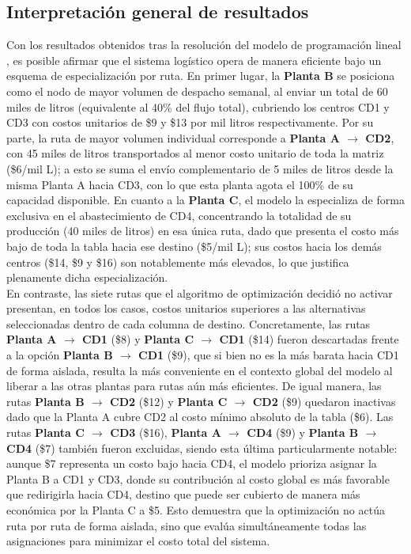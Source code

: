\documentclass[12pt,a4paper]{article}
\begin{document}
\subsection{Interpretaci\'{o}n general de resultados}

\noindent
Con los resultados obtenidos tras la resoluci\'{o}n del modelo de programaci\'{o}n lineal 
, es posible afirmar que el sistema log\'{i}stico opera de manera eficiente 
bajo un esquema de especializaci\'{o}n por ruta. En primer lugar, la \textbf{Planta B} se 
posiciona como el nodo de mayor volumen de despacho semanal, al enviar un total de 60 miles 
de litros (equivalente al 40\% del flujo total), cubriendo los centros CD1 y CD3 con costos 
unitarios de \$9 y \$13 por mil litros respectivamente. Por su parte, la ruta de mayor volumen 
individual corresponde a \textbf{Planta A $\to$ CD2}, con 45 miles de litros transportados al 
menor costo unitario de toda la matriz (\$6/mil L); a esto se suma el env\'{i}o complementario 
de 5 miles de litros desde la misma Planta A hacia CD3, con lo que esta planta agota el 100\% 
de su capacidad disponible. En cuanto a la \textbf{Planta C}, el modelo la especializa de forma 
exclusiva en el abastecimiento de CD4, concentrando la totalidad de su producci\'{o}n (40 miles 
de litros) en esa \'{u}nica ruta, dado que presenta el costo m\'{a}s bajo de toda la tabla hacia 
ese destino (\$5/mil L); sus costos hacia los dem\'{a}s centros (\$14, \$9 y \$16) son 
notablemente m\'{a}s elevados, lo que justifica plenamente dicha especializaci\'{o}n.\\

En contraste, las siete rutas que el algoritmo de optimizaci\'{o}n decidi\'{o} no activar 
presentan, en todos los casos, costos unitarios superiores a las alternativas seleccionadas 
dentro de cada columna de destino. Concretamente, las rutas 
\textbf{Planta A $\to$ CD1} (\$8) y \textbf{Planta C $\to$ CD1} (\$14) fueron descartadas 
frente a la opci\'{o}n \textbf{Planta B $\to$ CD1} (\$9), que si bien no es la m\'{a}s barata 
hacia CD1 de forma aislada, resulta la m\'{a}s conveniente en el contexto global del modelo al 
liberar a las otras plantas para rutas a\'{u}n m\'{a}s eficientes. De igual manera, las rutas 
\textbf{Planta B $\to$ CD2} (\$12) y \textbf{Planta C $\to$ CD2} (\$9) quedaron inactivas dado 
que la Planta A cubre CD2 al costo m\'{i}nimo absoluto de la tabla (\$6). Las rutas 
\textbf{Planta C $\to$ CD3} (\$16), \textbf{Planta A $\to$ CD4} (\$9) y \textbf{Planta B $\to$ CD4} 
(\$7) tambi\'{e}n fueron excluidas, siendo esta \'{u}ltima particularmente notable: aunque \$7 
representa un costo bajo hacia CD4, el modelo prioriza asignar la Planta B a CD1 y CD3, donde 
su contribuci\'{o}n al costo global es m\'{a}s favorable que redirigirla hacia CD4, destino que 
puede ser cubierto de manera m\'{a}s econ\'{o}mica por la Planta C a \$5. Esto demuestra que la 
optimizaci\'{o}n no act\'{u}a ruta por ruta de forma aislada, sino que eval\'{u}a 
simult\'{a}neamente todas las asignaciones para minimizar el costo total del sistema.\\
\end{document}

